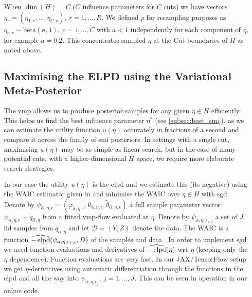 When $\dim(H)=C$ ($C$ influence parameters for $C$ cuts) we have vectors $\eta_r=(\eta_{1,r},...,\eta_{C,r}),\ r=1,...,R$. We defined $\rho$ for resampling purposes as $\eta_{c,r}\sim \mbox{beta}(a,1),\ c=1,...,C$ with $a<1$ independently for each component of $\eta$, for example $a=0.2$. This concentrates sampled $\eta$ at the Cut boundaries of $H$ as noted above.

\subsection{Maximising the ELPD using the Variational Meta-Posterior}\label{subsec:best_smi_vmp}

The \acrshort*{vmp} allows us to produce posterior samples for any given $\eta \in H$ efficiently. This helps us find the best influence parameter $\eta^*$ (see \cref{subsec:best_smi}), as we can estimate the utility function $u(\eta)$ accurately in fractions of a second and compare it across the family of \acrshort*{smi} posteriors. In settings with a single cut, maximising $u(\eta)$ may be as simple as linear search, but in the case of many potential cuts, with a higher-dimensional $H$ space, we require more elaborate search strategies.

In our case the utility $u(\eta)$ is the \acrshort*{elpd} and we estimate this (its negative) using the WAIC estimator given in \cite{Vehtari2016} and minimise the WAIC over $\eta\in H$ with \acrshort*{sgd}. Denote by $\psi_{\hat\alpha,\eta,\epsilon}=(\varphi_{\hat\alpha,\eta,\epsilon},\theta_{\hat\alpha,\eta,\epsilon},\tilde\theta_{\hat\alpha,\eta,\epsilon})$ a full sample parameter vector $\psi_{\alpha,\eta,\epsilon}\sim q_{\hat\alpha,\eta}$ from a fitted \acrshort*{vmp}-flow evaluated at $\eta$. Denote by $\psi_{\alpha,\eta,\epsilon_{1:J}}$ a set of $J$ iid samples from $q_{\alpha,\eta}$ and let $\mathcal{D}=(Y,Z)$ denote the data. The WAIC is a function $\widehat {-\operatorname{\text{elpd}}}(\psi_{\alpha,\eta,\epsilon_{1:J}},D)$ of the samples and data \citep{Vehtari2016}. In order to implement \acrshort*{sgd} we need function evaluations and derivatives of $\widehat {-\operatorname{\text{elpd}}}(\eta)$ wrt $\eta$ (keeping only the $\eta$ dependence). Function evaluations are very fast. In our JAX/TensorFlow setup \citep{deepmind2020jax,Dillon2017tfp} we get $\eta$-derivatives using automatic differentiation through the functions in the \acrshort*{elpd} and all the way into $\psi_{\alpha,\eta,\epsilon_{j}},\ j=1,...,J$.
This can be seen in operation in our online code.

